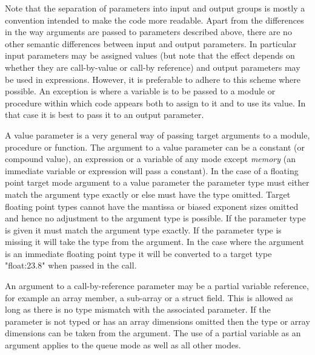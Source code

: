             Note that the separation of parameters into input and output groups
            is mostly a convention intended to make the code more readable.
            Apart from the differences in the way arguments are passed to
            parameters described above, there are no other semantic differences
            between input and output parameters. In particular input
            parameters may be assigned values (but note that the effect depends
            on whether they are call-by-value or call-by reference) and 
            output parameters may be used in expressions. However, it is preferable
            to adhere to this scheme where possible. An exception is
            where a variable is to be passed to a module or procedure within
            which code appears both to assign to it and to use its value. In that
            case it is best to pass it to an output parameter.

            A value parameter is a very general way of passing target
            arguments to a module, procedure or function. The argument to a
            value parameter can be a constant (or compound value), an
            expression or a variable of any mode except {\em memory} (an
            immediate variable or expression will pass a constant). In the case
            of a floating point target mode argument to a value parameter the
            parameter type must either match the argument type exactly or else
            must have the type omitted. Target floating point types cannot have
            the mantissa or biased exponent sizes omitted and hence no
            adjustment to the argument type is possible. If the parameter type
            is given it must match the argument type exactly. If the parameter
            type is missing it will take the type from the argument. In the
            case where the argument is an immediate floating point type it will
            be converted to a target type "float:23.8" when passed in the call.

            An argument to a call-by-reference parameter may be a partial
            variable reference, for example an array member, a sub-array or a
            struct field. This is allowed as long as there is no type mismatch
            with the associated parameter. If the parameter is not typed or has
            an array dimensions omitted then the type or array dimensions can
            be taken from the argument. The use of a partial variable as an
            argument applies to the queue mode as well as all other modes.

